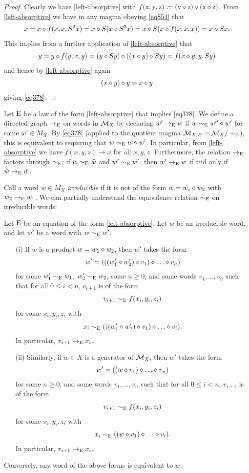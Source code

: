 \begin{proof}  Clearly we have \eqref{left-absorptive} with $f(\mathrm{x},\mathrm{y},\mathrm{z}) \coloneqq (\mathrm{y} \diamond \mathrm{z}) \diamond (\mathrm{x} \diamond \mathrm{z})$.  From \eqref{left-absorptive} we have in any magma obeying \eqref{eq854} that
$$x = x \diamond f(x,x,S^2 x) = x \diamond S(x \diamond S^2 x) = x \diamond S(x \diamond f(x,x,x)) = x \diamond Sx.$$
This implies from a further application of \eqref{left-absorptive} that
$$ y = y \diamond f(y,x,y) = (y \diamond Sy) \diamond ((x \diamond y) \diamond Sy) = f(x \diamond y, y, Sy)$$
and hence by \eqref{left-absorptive} again
$$ (x \diamond y) \diamond y = x \diamond y$$
giving \eqref{eq378}.
\end{proof}

Let $\mathrm{E}$ be a law of the form \eqref{left-absorptive} that implies \eqref{eq378}. We define a directed graph $\to_{\mathrm{E}}$ on words in ${\mathcal{M}}_X$ by declaring $w' \to_{\mathrm{E}} w$ if $w \sim_{\mathrm{E}} w'' \diamond w'$ for some $w' \in M_X$.  By \eqref{eq378} (applied to the quotient magma ${\mathcal{M}}_{X,E} = {\mathcal{M}}_X/\sim_{\mathrm{E}}$), this is equivalent to requiring that $w \sim_{\mathrm{E}} w \diamond w'$. In particular, from \eqref{left-absorptive} we have $f(x,y,z) \to x$ for all $x,y,z$.  Furthermore, the relation $\to_{\mathrm{E}}$ factors through $\sim_{\mathrm{E}}$: if $w \sim_{\mathrm{E}} \tilde w$ and $w' \sim_{\mathrm{E}} \tilde w'$, then $w' \to_{\mathrm{E}} w$ if and only if $\tilde w \to_{\mathrm{E}} \tilde w$.

Call a word $w \in M_X$ \emph{irreducible} if it is not of the form $w = w_1 \diamond w_2$ with $w_2 \to_{\mathrm{E}} w_1$.  We can partially understand the equivalence relation $\sim_{\mathrm{E}}$ on irreducible words:

\begin{theorem}\label{irred-desc}  Let $\mathrm{E}$ be an equation of the form \eqref{left-absorptive}.  Let $w$ be an irreducible word, and let $w'$ be a word with $w \sim_{\mathrm{E}} w'$.
  \begin{itemize}
    \item[(i)] If $w$ is a product $w = w_1 \diamond w_2$, then $w'$ takes the form
$$ w' = (((w'_1 \op w'_2) \op v_1) \op \dots \op v_n)$$
for some $w'_1 \sim_{\mathrm{E}} w_1$, $w'_2 \sim_{\mathrm{E}} w_2$, some $n \geq 0$, and some words $v_1, \dots, v_n$ such that for all $0 \leq i < n$, $v_{i+1}$ is of the form
$$ v_{i+1} \sim_{\mathrm{E}} f(x_i,y_i,z_i)$$
for some $x_i, y_i, z_i$ with
$$ x_i \sim_\E (((w'_1 \op w'_2) \op v_1) \op \dots \op v_i).$$
In particular, $v_{i+1} \to_{\mathrm{E}} x_i$.
  \item[(ii)] Similarly, if $w \in X$ is a generator of ${\mathcal{M}}_X$, then $w'$ takes the form
$$ w' = ((w \op v_1) \op \dots \op v_n)$$
for some $n \geq 0$, and some words $v_1, \dots, v_n$ such that for all $0 \leq i < n$, $v_{i+1}$ is of the form
$$ v_{i+1} \sim_{\mathrm{E}} f(x_i,y_i,z_i)$$
for some $x_i, y_i, z_i$ with
$$ x_i \sim_\E ((w \op v_1) \op \dots \op v_i).$$
In particular, $v_{i+1} \to_{\mathrm{E}} x_i$.
\end{itemize}
Conversely, any word of the above forms is equivalent to $w$.
\end{theorem}

